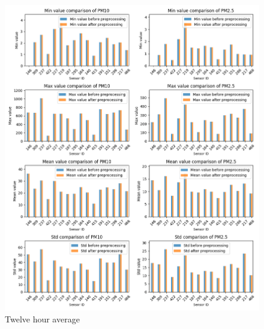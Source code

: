 \documentclass[12pt,a4paper,twoside]{scrartcl}
\numberwithin{equation}{section}
\newcounter{mypagecount}%
\newenvironment{interlude}{%
  \clearpage
  \setcounter{mypagecount}{\value{page}}%
  \thispagestyle{empty}%
  \pagestyle{empty}%
}{%
  \clearpage
  \setcounter{page}{\value{mypagecount}}%
}
\begin{document}
\begin{interlude}
\begin{appendices}
\begin{center}
      \begin{figure}[H]
        \centerline{\includegraphics[width=1.1\textwidth,height=1.3\textwidth]{figures/data_files_changes/12H_sensor_metrics}}
        \caption[Metrics change during preprocessing (twelve hour average)]{Twelve hour average}
      \end{figure}


\end{center}
\end{appendices}
\end{interlude}
\end{document}
